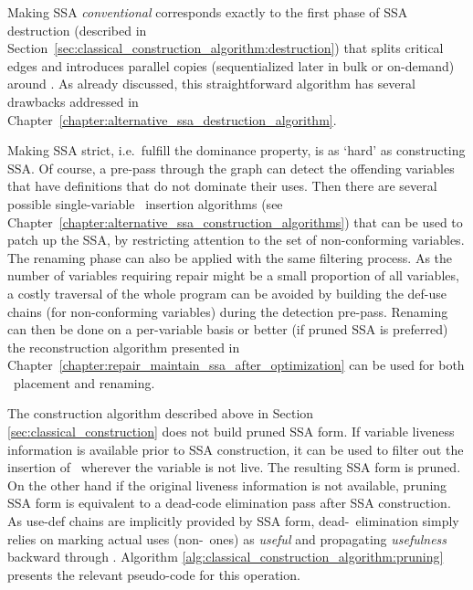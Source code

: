 Making SSA \textit{conventional} corresponds exactly to the first phase of SSA destruction (described in Section~\ref{sec:classical_construction_algorithm:destruction}) that splits critical edges and introduces parallel copies (sequentialized later in bulk or on-demand) around \phiops. As already discussed, this straightforward algorithm has several drawbacks addressed in Chapter~\ref{chapter:alternative_ssa_destruction_algorithm}.

Making SSA strict, i.e.\ fulfill the dominance property, is as `hard' as constructing SSA. Of course, a pre-pass through the graph can detect the offending variables that have definitions that do not dominate their uses. Then there are several possible single-variable \phiop\ insertion algorithms (see Chapter~\ref{chapter:alternative_ssa_construction_algorithms}) that can be used to patch up the SSA, by restricting attention to the set of non-conforming variables. The renaming phase can also be applied with the same filtering process. As the number of variables requiring repair might be a small proportion of all variables, a costly traversal of the whole program can be avoided by building the def-use chains (for non-conforming variables) during the detection pre-pass. Renaming can then be done on a per-variable basis or better (if pruned SSA is preferred) the reconstruction algorithm presented in Chapter~\ref{chapter:repair_maintain_ssa_after_optimization} can be used for both \phiops\ placement and renaming.

The construction algorithm described above in
Section \ref{sec:classical_construction} does not
build pruned SSA form. 
If variable liveness information is available prior
to SSA construction, it can be used to filter out the 
insertion of \phiops\ wherever the variable is not live.
The resulting SSA form is pruned.
On the other hand
if the original liveness information is not available, 
pruning SSA form is equivalent to a dead-code elimination pass
after SSA construction.
As use-def chains are implicitly provided by SSA form, 
dead-\phiop\ elimination simply relies on marking actual uses 
(non-\phiop\ ones) as \emph{useful} and propagating 
\emph{usefulness} backward through \phiops.
Algorithm \ref{alg:classical_construction_algorithm:pruning} 
presents the relevant pseudo-code for this operation.

